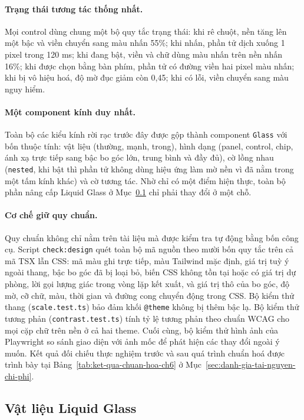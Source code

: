 \paragraph{Trạng thái tương tác thống nhất.} Mọi control dùng chung một bộ quy tắc trạng thái: khi rê chuột, nền tăng lên một bậc và viền chuyển sang màu nhấn 55\%; khi nhấn, phần tử dịch xuống 1 pixel trong 120 ms; khi đang bật, viền và chữ dùng màu nhấn trên nền nhấn 16\%; khi được chọn bằng bàn phím, phần tử có đường viền hai pixel màu nhấn; khi bị vô hiệu hoá, độ mờ đục giảm còn 0,45; khi có lỗi, viền chuyển sang màu nguy hiểm.

\paragraph{Một component kính duy nhất.} Toàn bộ các kiểu kính rời rạc trước đây được gộp thành component \texttt{Glass} với bốn thuộc tính: vật liệu (thường, mạnh, trong), hình dạng (panel, control, chip, ánh xạ trực tiếp sang bậc bo góc lớn, trung bình và đầy đủ), cờ lồng nhau (\texttt{nested}, khi bật thì phần tử không dùng hiệu ứng làm mờ nền vì đã nằm trong một tấm kính khác) và cờ tương tác. Nhờ chỉ có một điểm hiện thực, toàn bộ phần nâng cấp Liquid Glass ở Mục~\ref{subsec:liquid-glass} chỉ phải thay đổi ở một chỗ.

\paragraph{Cơ chế giữ quy chuẩn.} Quy chuẩn không chỉ nằm trên tài liệu mà được kiểm tra tự động bằng bốn công cụ. Script \texttt{check:design} quét toàn bộ mã nguồn theo mười bốn quy tắc trên cả mã TSX lẫn CSS: mã màu ghi trực tiếp, màu Tailwind mặc định, giá trị tuỳ ý ngoài thang, bậc bo góc đã bị loại bỏ, biến CSS không tồn tại hoặc có giá trị dự phòng, lời gọi lượng giác trong vòng lặp kết xuất, và giá trị thô của bo góc, độ mờ, cỡ chữ, màu, thời gian và đường cong chuyển động trong CSS. Bộ kiểm thử thang (\texttt{scale.test.ts}) bảo đảm khối \texttt{@theme} không bị thêm bậc lạ. Bộ kiểm thử tương phản (\texttt{contrast.test.ts}) tính tỷ lệ tương phản theo chuẩn WCAG cho mọi cặp chữ trên nền ở cả hai theme. Cuối cùng, bộ kiểm thử hình ảnh của Playwright so sánh giao diện với ảnh mốc để phát hiện các thay đổi ngoài ý muốn. Kết quả đối chiếu thực nghiệm trước và sau quá trình chuẩn hoá được trình bày tại Bảng~\ref{tab:ket-qua-chuan-hoa-ch6} ở Mục~\ref{sec:danh-gia-tai-nguyen-chi-phi}.

\subsection{Vật liệu Liquid Glass}
\label{subsec:liquid-glass}

